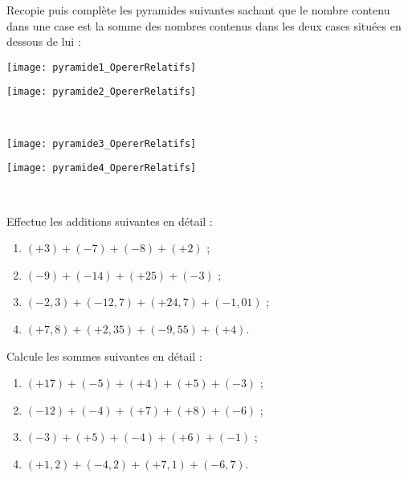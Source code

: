 \begin{exercice}[La pyramide]
Recopie puis complète les pyramides suivantes sachant que le nombre contenu dans une case est la somme des nombres contenus dans les deux cases situées en dessous de lui : \\

\begin{minipage}[c]{0.48\linewidth}
\begin{center} \texttt{[image: pyramide1\_OpererRelatifs]} \end{center}
\end{minipage} \hfill%
 \begin{minipage}[c]{0.48\linewidth}
\begin{center} \texttt{[image: pyramide2\_OpererRelatifs]} \end{center} 
\end{minipage} \\
\end{exercice}


\begin{exercice}
\vspace{0.5em}
\begin{minipage}[c]{0.48\linewidth}
\begin{center} \texttt{[image: pyramide3\_OpererRelatifs]} \end{center}
 \end{minipage} \hfill%
 \begin{minipage}[c]{0.48\linewidth}
\begin{center} \texttt{[image: pyramide4\_OpererRelatifs]} \end{center}
  \end{minipage} \\
\end{exercice}


\begin{exercice}
Effectue les additions suivantes en détail :
\begin{enumerate}
 \item $(+3) + (-7) + (-8) + (+2)$ ;
 \item $(-9) + (-14) + (+25) + (-3)$ ;
 \item $(-2,3) + (-12,7) + (+24,7) + (-1,01)$ ;
 \item $(+7,8) + (+2,35) + (-9,55) + (+4)$.
 \end{enumerate}
\end{exercice}


\begin{exercice}
Calcule les sommes suivantes en détail :
\begin{enumerate}
 \item $(+17) + (-5) + (+4) + (+5) + (-3)$ ;
 \item $(-12) + (-4) + (+7) + (+8) + (-6)$ ;
 \item $(-3) + (+5) + (-4) + (+6) + (-1)$ ;
 \item $(+1,2) + (-4,2) + (+7,1) + (-6,7)$.
 \end{enumerate}
\end{exercice}


